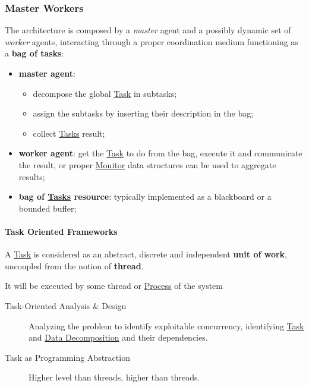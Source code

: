 \subsubsection{Master Workers}\label{sub:ed_master_workers} %
The architecture is composed by a \textit{master} agent and a possibly dynamic set of \textit{worker} agents, interacting through a proper coordination medium functioning as a \textbf{bag of tasks}:
\begin{itemize}
    \item \textbf{master agent}:
        \begin{itemize}
            \item decompose the global \hyperref[def:task]{Task} in subtasks;
            \item assign the subtasks by inserting their description in the bag;
            \item collect \hyperref[def:task]{Tasks} result;
        \end{itemize}
    \item \textbf{worker agent}: get the \hyperref[def:task]{Task} to do from the bag, execute it and communicate the result, or proper \hyperref[def:monitor]{Monitor} data structures can be used to aggregate results;
    \item \textbf{bag of \hyperref[def:task]{Tasks} resource}: typically implemented as a blackboard or a bounded buffer;
\end{itemize}
%
\paragraph{Task Oriented Frameworks}\label{par:ed_task_oriented_frameworks} %
A \hyperref[def:task]{Task} is considered as an abstract, discrete and independent \textbf{unit of work}, uncoupled from the notion of \textbf{thread}.
\begin{note}
    It will be executed by some thread or \hyperref[def:process]{Process} of the system
\end{note}
\begin{description}
    \item[Task-Oriented Analysis \& Design] Analyzing the problem to identify exploitable concurrency, identifying \hyperref[def:task]{Task} and \hyperref[sub:ed_data_decomposition_pattern]{Data Decomposition} and their dependencies.
    \item[Task as Programming Abstraction] Higher level than threads, higher than threads.
\end{description}
%
